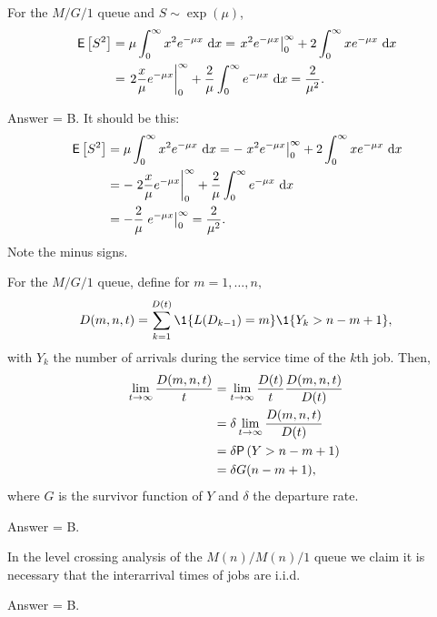 \begin{exercise}[201804]
For the $M/G/1$ queue and $S\sim \exp(\mu)$,
    \begin{align*}
\,\mathsf{E}\left[S^2\right] 
&= \mu \int_0^\infty x^2 e^{- \mu x} \,\,\text{d}x = \left. x^2 e^{-\mu x} \right|_0^\infty + 2 \int_0^\infty x e^{-\mu x} \, \,\text{d}x \\
&= \left. 2\frac x \mu e^{-\mu x} \right|_0^\infty + \frac 2 \mu\int_0^\infty e^{-\mu x} \, \,\text{d}x =\frac2{\mu^2}.
    \end{align*}
\begin{solution}
Answer = B.
It should be this:
    \begin{align*}
\,\mathsf{E}\left[S^2\right] 
&= \mu \int_0^\infty x^2 e^{- \mu x} \,\,\text{d}x = -\left. x^2 e^{-\mu x} \right|_0^\infty + 2 \int_0^\infty x e^{-\mu x} \, \,\text{d}x \\
&= -\left. 2\frac x \mu e^{-\mu x} \right|_0^\infty + \frac 2 \mu\int_0^\infty e^{-\mu x} \, \,\text{d}x \\
&= - \frac 2 \mu  \left. e^{-\mu x}\right|_0^\infty = \frac2{\mu^2}.
    \end{align*}
Note the minus signs.
\end{solution}
\end{exercise}

\begin{exercise}[201804]
For the $M/G/1$ queue, define for $m=1,\ldots, n,$
\begin{equation*}
  D(m, n, t) = \sum_{k=1}^{D(t)}\1{L(D_{k-1})=m}\1{Y_k>n-m+1},
\end{equation*}
with $Y_k$ the number of arrivals during the service time of the $k$th job. 
Then,
\begin{align*}
  \lim_{t\to\infty} \frac{  D(m, n, t)}t 
&=   \lim_{t\to\infty}  \frac{D(t)}t\frac{ D(m, n, t)}{D(t)} \\
&=   \delta \lim_{t\to\infty} \frac{ D(m, n, t)}{D(t)} \\
&=   \delta \P{Y>n-m+1}\\
& = \delta  G(n-m+1),
\end{align*}
where $G$ is the survivor function of $Y$ and $\delta$ the departure rate.
\begin{solution}
Answer = B.
\end{solution}
\end{exercise}



\begin{exercise}[201807]
In the level crossing analysis of the $M(n)/M(n)/1$ queue we claim it is necessary that the interarrival times of jobs are i.i.d.
\begin{solution}
Answer = B. 
\end{solution}
\end{exercise}

